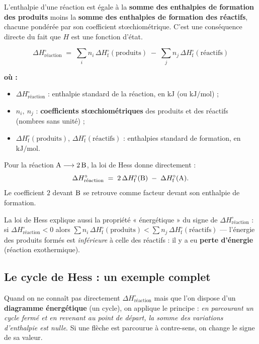\documentclass[11pt,a4paper]{article}
\newenvironment{ou}{%
  \par\smallskip\noindent\textbf{où :}\nopagebreak
  \begin{itemize}[leftmargin=1.8em,topsep=2pt,itemsep=1.5pt,parsep=0pt]}%
  {\end{itemize}}
\newcommand{\dHr}{\Delta H^{\circ}_{\text{réaction}}}
\newcommand{\dHf}{\Delta H^{\circ}_{\text{f}}}
\begin{document}
\begin{theoreme}
L'enthalpie d'une réaction est égale à la \textbf{somme des enthalpies de formation des produits} moins
la \textbf{somme des enthalpies de formation des réactifs}, chacune pondérée par son coefficient
stœchiométrique. C'est une conséquence directe du fait que $H$ est une fonction d'état.
\end{theoreme}

\begin{formule}
\[ \boxed{\;\dHr \;=\; \sum_i n_i\,\dHf(\text{produits}) \;-\; \sum_j n_j\,\dHf(\text{réactifs})\;} \]
\begin{ou}
  \item $\dHr$ : enthalpie standard de la réaction, en $\si{\kilo\joule}$ (ou $\si{\kilo\joule\per\mol}$) ;
  \item $n_i,\ n_j$ : \textbf{coefficients stœchiométriques} des produits et des réactifs (nombres sans unité) ;
  \item $\dHf(\text{produits})$, $\dHf(\text{réactifs})$ : enthalpies standard de formation, en $\si{\kilo\joule\per\mol}$.
\end{ou}
\end{formule}

\begin{exemple}
Pour la réaction \;$\ce{A} \longrightarrow 2\,\ce{B}$\;, la loi de Hess donne directement :
\[ \dHr \;=\; 2\,\dHf(\ce{B}) \;-\; \dHf(\ce{A}). \]
Le coefficient $2$ devant $\ce{B}$ se retrouve comme facteur devant son enthalpie de formation.
\end{exemple}

\begin{remarque}
La loi de Hess explique aussi la propriété « énergétique » du signe de $\dHr$ : si $\dHr < 0$ alors
$\sum n_i\,\dHf(\text{produits}) < \sum n_j\,\dHf(\text{réactifs})$ — l'énergie des produits formés est
\emph{inférieure} à celle des réactifs : il y a eu \textbf{perte d'énergie} (réaction exothermique).
\end{remarque}

\subsection{Le cycle de Hess : un exemple complet}

Quand on ne connaît pas directement $\dHr$ mais que l'on dispose d'un \textbf{diagramme énergétique}
(un cycle), on applique le principe : \emph{en parcourant un cycle fermé et en revenant au point de
départ, la somme des variations d'enthalpie est nulle}. Si une flèche est parcourue à contre-sens, on
change le signe de sa valeur.
\end{document}
